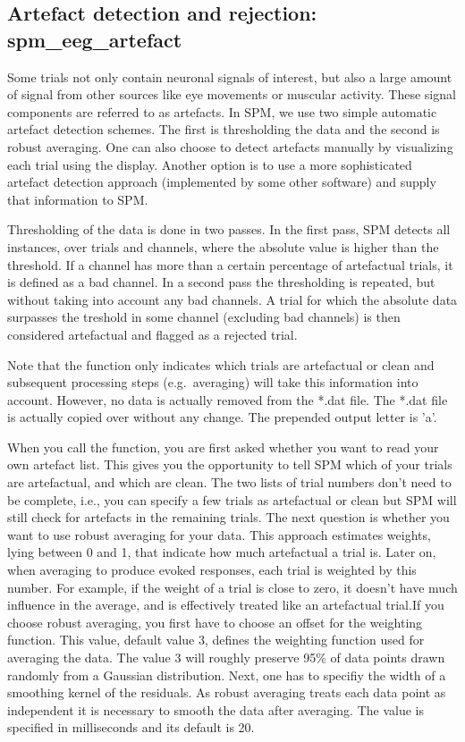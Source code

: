 \subsection{Artefact detection and rejection: spm\_eeg\_artefact}
Some trials not only contain neuronal signals of
interest, but also a large amount of signal from other sources like
eye movements or muscular activity. These signal components are
referred to as artefacts. In SPM, we use two simple automatic
artefact detection schemes. The first is thresholding the data and the
second is robust averaging. One can also choose to detect artefacts
manually by visualizing each trial using the display. Another option
is to use a more sophisticated artefact detection approach
(implemented by some other software) and supply that information to
SPM. 

Thresholding of the data is done in two passes. In the first pass, SPM
detects all instances, over trials and channels, where the
absolute value is higher than the threshold. If a channel has more
than a certain percentage of artefactual trials, it is defined as a
bad channel. In a second pass the thresholding is repeated, but
without taking into account any bad channels. A trial for which the
absolute data surpasses the treshold in some channel (excluding bad
channels) is then considered artefactual and flagged as a rejected
trial.

Note that the function only indicates which trials are artefactual or
clean and subsequent processing steps (e.g.~averaging) will take this 
information into account. However, no data is actually removed from
the *.dat file. The *.dat file is actually copied over without any
change. The prepended output letter is 'a'.

When you call the function, you are first asked whether you want
to read your own artefact list. This gives you the opportunity to 
tell SPM which of your trials are artefactual, and which are clean. 
The two lists of trial numbers don't need to be complete, i.e., you
can specify a few trials as artefactual or clean but SPM will still
check for artefacts in the remaining trials. 
The next question is whether you want to use robust averaging for your data.
This approach estimates weights, lying between 0 and 1, that indicate how much 
artefactual a trial is. Later on, when averaging to produce evoked responses, 
each trial is weighted by this number. For example, if the weight of 
a trial is close to zero, it doesn't have much influence in the average, 
and is effectively treated like an artefactual trial.If you choose
robust averaging, you first have to choose an offset for the weighting
function. This value, default value 3, defines the weighting function
used for averaging the data. The value 3 will roughly preserve 95\% of
data points drawn randomly from a Gaussian distribution. Next, one has
to specifiy the width of a smoothing kernel of the residuals. As
robust averaging treats each data point as independent it is necessary
to smooth the data after averaging. The value is specified in
milliseconds and its default is 20.

